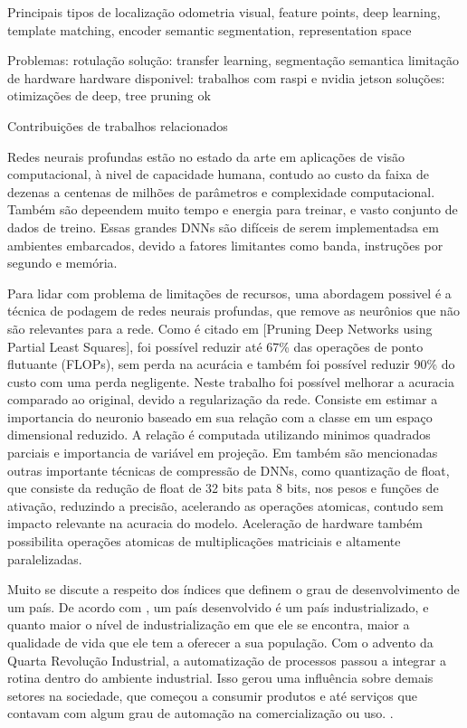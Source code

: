 
Principais tipos de localização
odometria visual, feature points, deep learning, template matching, encoder
semantic segmentation, representation space

Problemas: 
  rotulação
   solução: transfer learning, segmentação semantica 
  limitação de hardware
    hardware disponivel: trabalhos com raspi e nvidia jetson 
  soluções: otimizações de deep, tree pruning ok 

Contribuições de trabalhos relacionados



Redes neurais profundas estão no estado da arte em aplicações de visão computacional, à nivel de capacidade humana, contudo ao custo da faixa de dezenas a centenas de milhões de parâmetros e complexidade computacional. Também são depeendem muito tempo e energia para treinar, e vasto conjunto de dados de treino. Essas grandes DNNs são difíceis de serem implementadsa em ambientes embarcados, devido a fatores limitantes como banda, instruções por segundo e memória. 

Para lidar com problema de limitações de recursos, uma abordagem possivel é a técnica de podagem de redes neurais profundas, que remove as neurônios que não são relevantes para a rede. Como é citado em [Pruning Deep Networks using Partial Least Squares], foi possível reduzir até 67\% das operações de ponto flutuante (FLOPs), sem perda na acurácia e também foi possível reduzir 90\% do custo com uma perda negligente. Neste trabalho foi possível melhorar a acuracia comparado ao original, devido a regularização da rede. Consiste em estimar a importancia do neuronio baseado em sua relação com a classe em um espaço dimensional reduzido. A relação é computada utilizando minimos quadrados parciais e importancia de variável em projeção. Em \cite{jordao2019pruning} também são mencionadas outras importante técnicas de compressão de DNNs, como quantização de float, que consiste da redução de float de 32 bits pata 8 bits, nos pesos e funções de ativação, reduzindo a precisão, acelerando as operações atomicas, contudo sem impacto relevante na acuracia do modelo. Aceleração de hardware também possibilita operações atomicas de multiplicações matriciais e altamente paralelizadas. \cite{liang2021pruning}



Muito se discute a respeito dos índices que definem o grau de desenvolvimento de um país. De acordo com \cite{paranhos2007gestao}, um país desenvolvido é um país industrializado, e quanto maior o nível de industrialização em que ele se encontra, maior a qualidade de vida que ele tem a oferecer a sua população. Com o advento da Quarta Revolução Industrial, a automatização de processos passou a integrar a rotina dentro do ambiente industrial. Isso gerou uma influência sobre demais setores na sociedade, que começou a consumir produtos e até serviços que contavam com algum grau de automação na comercialização ou uso. \cite{schwab2019quarta}.

